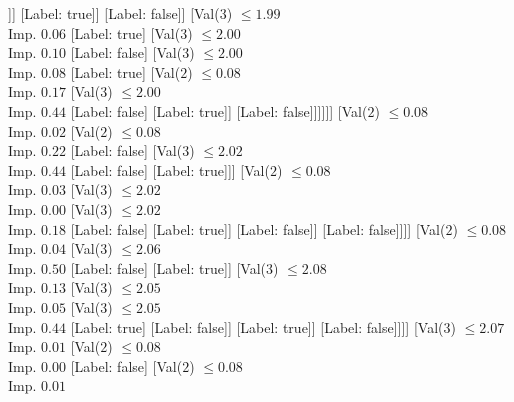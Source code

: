 \documentclass[margin=10pt]{standalone}
\begin{document}
\begin{forest}
												[Val($3$) $ \leq 1.98$ \\ Imp. $0.14$
													[Val($3$) $ \leq 1.98$ \\ Imp. $0.05$
														[Label: false]
														[Val($3$) $ \leq 1.98$ \\ Imp. $0.44$
															[Label: true]
															[Label: false]]]
													[Label: true]]
												[Label: false]]
											[Val($3$) $ \leq 1.99$ \\ Imp. $0.06$
												[Label: true]
												[Val($3$) $ \leq 2.00$ \\ Imp. $0.10$
													[Label: false]
													[Val($3$) $ \leq 2.00$ \\ Imp. $0.08$
														[Label: true]
														[Val($2$) $ \leq 0.08$ \\ Imp. $0.17$
															[Val($3$) $ \leq 2.00$ \\ Imp. $0.44$
																[Label: false]
																[Label: true]]
															[Label: false]]]]]]
										[Val($2$) $ \leq 0.08$ \\ Imp. $0.02$
											[Val($2$) $ \leq 0.08$ \\ Imp. $0.22$
												[Label: false]
												[Val($3$) $ \leq 2.02$ \\ Imp. $0.44$
													[Label: false]
													[Label: true]]]
											[Val($2$) $ \leq 0.08$ \\ Imp. $0.03$
												[Val($3$) $ \leq 2.02$ \\ Imp. $0.00$
													[Val($3$) $ \leq 2.02$ \\ Imp. $0.18$
														[Label: false]
														[Label: true]]
													[Label: false]]
												[Label: false]]]]
									[Val($2$) $ \leq 0.08$ \\ Imp. $0.04$
										[Val($3$) $ \leq 2.06$ \\ Imp. $0.50$
											[Label: false]
											[Label: true]]
										[Val($3$) $ \leq 2.08$ \\ Imp. $0.13$
											[Val($3$) $ \leq 2.05$ \\ Imp. $0.05$
												[Val($3$) $ \leq 2.05$ \\ Imp. $0.44$
													[Label: true]
													[Label: false]]
												[Label: true]]
											[Label: false]]]]
								[Val($3$) $ \leq 2.07$ \\ Imp. $0.01$
									[Val($2$) $ \leq 0.08$ \\ Imp. $0.00$
										[Label: false]
										[Val($2$) $ \leq 0.08$ \\ Imp. $0.01$

\end{forest}
\end{document}

